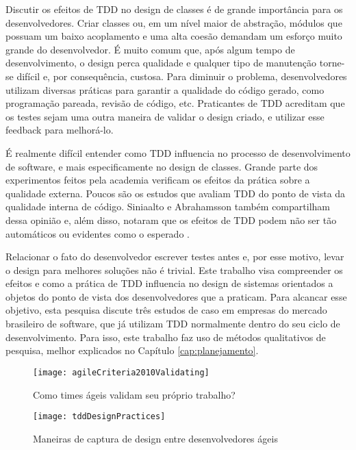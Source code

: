 Discutir os efeitos de TDD no design de classes é de grande importância para os
desenvolvedores.
Criar classes ou, em um nível maior de abstração, módulos que possuam um baixo
acoplamento e uma alta coesão demandam um esforço muito grande do desenvolvedor. 
É muito comum que, após algum tempo de desenvolvimento, o design perca qualidade
e qualquer tipo de manutenção torne-se difícil e, por consequência, custosa.
Para diminuir o problema, desenvolvedores utilizam diversas práticas para
garantir a qualidade do código gerado, como programação pareada, revisão de
código, etc. Praticantes de TDD acreditam que os testes sejam uma outra maneira
de validar o design criado, e utilizar esse feedback para melhorá-lo.

É realmente difícil entender como TDD influencia no processo de desenvolvimento
de software, e mais especificamente no design de classes. Grande parte dos
experimentos feitos pela academia verificam os efeitos da prática sobre a qualidade externa. 
Poucos são os estudos que avaliam TDD do ponto de vista da qualidade interna de
código. Siniaalto e Abrahamsson também compartilham dessa opinião e, além disso,
notaram que os efeitos de TDD podem não ser tão automáticos ou evidentes como o 
esperado \cite{alarming-results}.

Relacionar o fato do desenvolvedor escrever testes antes e, por esse motivo,
levar o design para melhores soluções não é trivial.
Este trabalho visa compreender os efeitos e como a prática de TDD
influencia no design de sistemas orientados a objetos do ponto de vista dos
desenvolvedores que a praticam. Para alcancar esse objetivo,
esta pesquisa discute três estudos de caso em empresas do mercado brasileiro de
software, que já utilizam TDD normalmente dentro do seu ciclo de
desenvolvimento. Para isso, este trabalho faz uso de métodos qualitativos de
pesquisa, melhor explicados no Capítulo \ref{cap:planejamento}.

\begin{figure}[ht]
  \begin{minipage}[b]{0.45\linewidth}
    \centering
    \texttt{[image: agileCriteria2010Validating]}
    \caption{Como times ágeis validam seu próprio trabalho?}
    \label{fig:wambler-agile-2010}
  \end{minipage}
  \hspace{0.5cm}
  \begin{minipage}[b]{0.45\linewidth}
    \centering
    \texttt{[image: tddDesignPractices]}
    \caption{Maneiras de captura de design entre desenvolvedores ágeis}  
    \label{fig:wambler-tdd-2008}
  \end{minipage}
\end{figure}			

